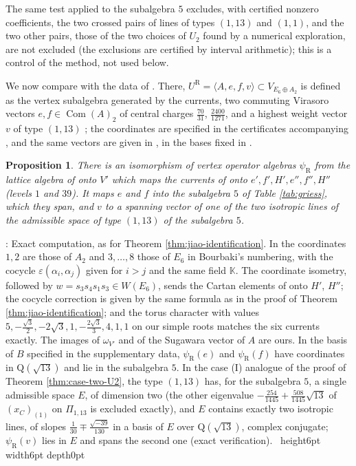 \documentclass[leqno]{article}
\newcommand{\K}{\ensuremath{\mathbb{K}}}
\newcommand{\Q}{\mathrm{Q}}
\newcommand{\la}{\langle}
\newcommand{\ra}{\rangle}
\newcommand{\qed}{\hfill \vrule height6pt  width6pt depth0pt}
\newcommand{\epsi}{\varepsilon}
\newtheorem{prop}[thm]{Proposition}
\newenvironment{proof}[1][]{\noindent {\it Proof #1} : }{\hbox{~}\qed
\smallskip
}
\numberwithin{equation}{section}
\begin{document}
The same test applied to the subalgebra $5$ excludes, with certified nonzero coefficients, the two crossed pairs of lines of types $(1,13)$ and $(1,1)$, and the two other pairs, those of the two choices of $U_2$ found by a numerical exploration, are not excluded (the exclusions are certified by interval arithmetic); this is a control of the method, not used below.

We now compare with the data of \cite{Rie26}. There, $U^{\mathrm R} = \la A, e, f, v\ra \subset V_{E_6 \oplus A_2}$ is defined as the vertex subalgebra generated by the currents, two commuting Virasoro vectors $e, f \in \operatorname{Com}(A)_2$ of central charges $\frac{70}{31}$, $\frac{2400}{1271}$, and a highest weight vector $v$ of type $(1,13)$ \cite[Section 1]{Rie26b}; the coordinates are specified in the certificates accompanying \cite{Rie26b}, and the same vectors are given in \cite[Section ``The explicit candidate'']{Rie26}, in the bases fixed in \cite{Rie26b}.

\begin{prop}
\label{prop:riesen-identification}
There is an isomorphism of vertex operator algebras $\psi_{\mathrm R}$ from the lattice algebra of \cite{Rie26} onto $V'$ which maps the currents of \cite{Rie26} onto $e', f', H', e'', f'', H''$ (levels $1$ and $39$). It maps $e$ and $f$ into the subalgebra $5$ of Table \ref{tab:griess}, which they span, and $v$ to a spanning vector of one of the two isotropic lines of the admissible space of type $(1,13)$ of the subalgebra $5$.
\end{prop}

\begin{proof}
Exact computation, as for Theorem \ref{thm:jiao-identification}. In \cite{Rie26b} the coordinates $1,2$ are those of $A_2$ and $3,\ldots,8$ those of $E_6$ in Bourbaki's numbering, with the cocycle $\epsi(\alpha_i,\alpha_j)$ given for $i > j$ and the same field $\K$. The coordinate isometry, followed by $w = s_3s_4s_1s_3 \in W(E_6)$, sends the Cartan elements of \cite{Rie26b} onto $H'$, $H''$; the cocycle correction is given by the same formula as in the proof of Theorem \ref{thm:jiao-identification}; and the torus character with values $5, -\frac{\sqrt3}2, -2\sqrt3, 1, -\frac{2\sqrt3}3, 4, 1, 1$ on our simple roots matches the six currents exactly. The images of $\omega_{V'}$ and of the Sugawara vector of $A$ are ours. In the basis of $B$ specified in the supplementary data, $\psi_{\mathrm R}(e)$ and $\psi_{\mathrm R}(f)$ have coordinates in $\Q(\sqrt{13})$ and lie in the subalgebra $5$. In the case (I) analogue of the proof of Theorem \ref{thm:case-two-U2}, the type $(1,13)$ has, for the subalgebra $5$, a single admissible space $E$, of dimension two (the other eigenvalue $-\frac{254}{1445}+\frac{508}{1445}\sqrt{13}$ of $(x_C)_{(1)}$ on $\Pi_{1,13}$ is excluded exactly), and $E$ contains exactly two isotropic lines, of slopes $\frac1{30} \mp \frac{\sqrt{-39}}{130}$ in a basis of $E$ over $\Q(\sqrt{13})$, complex conjugate; $\psi_{\mathrm R}(v)$ lies in $E$ and spans the second one (exact verification).
\end{proof}
\end{document}
